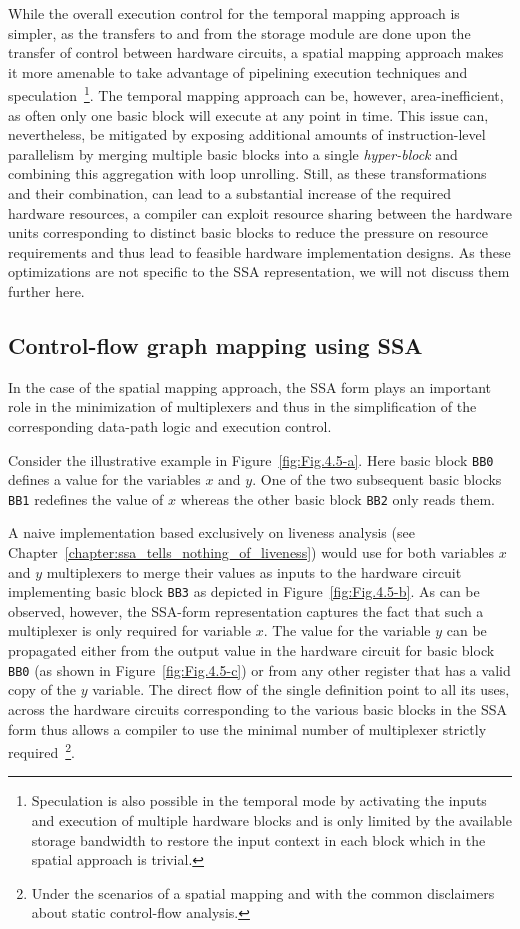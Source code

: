 While the overall execution control for the temporal mapping approach is simpler, as the transfers to and from the storage module are done upon the transfer of control between hardware circuits, a spatial mapping approach makes it more amenable to take advantage of pipelining execution techniques and speculation~\footnote{Speculation is also possible in the temporal mode by activating the inputs and execution of multiple hardware blocks and is only limited by the available storage bandwidth to restore the input context in each block which in the spatial approach is trivial.}. 
The temporal mapping approach can be, however, area-inefficient, as often only one basic block will execute at any point in time. 
This issue can, nevertheless, be mitigated by exposing additional amounts of instruction-level parallelism by merging multiple basic blocks into a single {\em hyper-block} and combining this aggregation with loop unrolling. 
Still, as these transformations and their combination, can lead to a substantial increase of the required hardware resources, a compiler can exploit resource sharing between the hardware units corresponding to distinct basic blocks to reduce the pressure on resource requirements and thus lead to feasible hardware implementation designs. 
As these optimizations are not specific to the SSA representation, we will not discuss them further here. 

\subsection{Control-flow graph mapping using SSA}
\label{sec:cfg_ssa_mapping}
In the case of the spatial mapping approach, the SSA form plays an important role in the minimization of multiplexers and thus in the simplification of the corresponding data-path logic and execution control.

Consider the illustrative example in Figure~\ref{fig:Fig.4.5-a}. 
Here basic block {\tt BB0} defines a value for the variables $x$ and $y$. 
One of the two subsequent basic blocks {\tt BB1} redefines the value of $x$ whereas the other basic block {\tt BB2} only reads them.

A naive implementation based exclusively on liveness analysis (see Chapter~\ref{chapter:ssa_tells_nothing_of_liveness}) would use for both variables $x$ and $y$ multiplexers to merge their values as inputs to the hardware circuit implementing basic block {\tt BB3} as depicted in Figure~\ref{fig:Fig.4.5-b}. 
As can be observed, however, the SSA-form representation captures the fact that such a multiplexer is only required for variable $x$. 
The value for the variable $y$ can be propagated either from the output value in the hardware circuit for basic block {\tt BB0} (as shown in Figure~\ref{fig:Fig.4.5-c}) or from any other register that has a valid copy of the $y$ variable. 
The direct flow of the single definition point to all its uses, across the hardware circuits corresponding to the various basic blocks in the SSA form thus allows a compiler to use the minimal number of multiplexer strictly required~\footnote{Under the scenarios of a spatial mapping and with the common disclaimers about static control-flow analysis.}.

